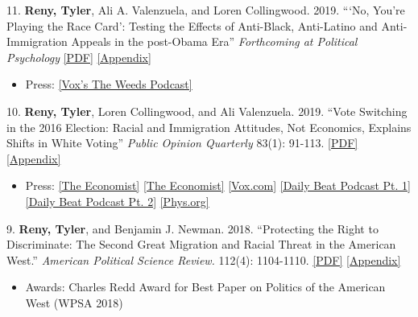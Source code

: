 \documentclass[11pt, a4paper]{article}
\newcommand{\years}[1]{\marginnote{\scriptsize #1}}
\begin{document}
\years{2019} 11. \textbf{Reny, Tyler}, Ali A. Valenzuela, and Loren Collingwood. 2019. ```No, You’re Playing the Race Card': Testing the Effects of Anti-Black, Anti-Latino and Anti-Immigration Appeals in the post-Obama Era''  \textit{Forthcoming at Political Psychology} \href{http://tylerreny.github.io/pdf/pubs/reny_etal_2019_polpsych.pdf}{[PDF]} \href{http://tylerreny.github.io/pdf/pubs/reny_etal_2019_polpsych_appendix.pdf}{[Appendix]} 
\begin{itemize}
  \item Press: \href{https://megaphone.link/VMP5167113125}{[Vox's The Weeds Podcast]} 
\end{itemize}

\years{} 10. \textbf{Reny, Tyler}, Loren Collingwood, and Ali Valenzuela. 2019. ``Vote Switching in the 2016 Election: Racial and Immigration Attitudes, Not Economics, Explains Shifts in White Voting''  \textit{Public Opinion Quarterly} 83(1): 91-113. \href{http://tylerreny.github.io/pdf/pubs/final_submission_reny_etal_poq_public.pdf}{[PDF]} \href{http://tylerreny.github.io/pdf/pubs/final_submission_reny_etal_poq_2018_appendix.pdf}{[Appendix]}

\begin{itemize}
  \item Press: \href{https://www.economist.com/united-states/2020/02/01/who-will-be-donald-trumps-most-forceful-foe}{[The Economist]} \href{https://www.economist.com/united-states/2019/07/04/the-best-line-in-the-first-televised-debate-may-hurt-the-democrats}{[The Economist]} \href{https://www.vox.com/policy-and-politics/2018/10/16/17980820/trump-obama-2016-race-racism-class-economy-2018-midterm}{[Vox.com]} \href{http://www.btrtoday.com/listen/thedailybeat/vote-switching-in-the-2016-election-with-tyler-reny-part-1/}{[Daily Beat Podcast Pt. 1]} \href{http://www.btrtoday.com/listen/thedailybeat/vote-switching-white-economic-anxiety-more-with-tyler-reny-part2/}{[Daily Beat Podcast Pt. 2]} \href{https://phys.org/news/2019-07-attitudes-immigration-underscored-vote-election.html}{[Phys.org]}
\end{itemize}

\years{2018} 9. \textbf{Reny, Tyler}, and Benjamin J. Newman. 2018. ``Protecting the Right to Discriminate: The Second Great Migration and Racial Threat in the American West.'' \textit{American Political Science Review.} 112(4): 1104-1110. \href{http://tylerreny.github.io/pdf/pubs/reny_newman_apsr_2018.pdf}{[PDF]} \href{http://tylerreny.github.io/pdf/pubs/reny_newman_apsr_2018_SI.pdf}{[Appendix]}
\begin{itemize}
  \item Awards: Charles Redd Award for Best Paper on Politics of the American West (WPSA 2018)
\end{itemize}
\end{document}
